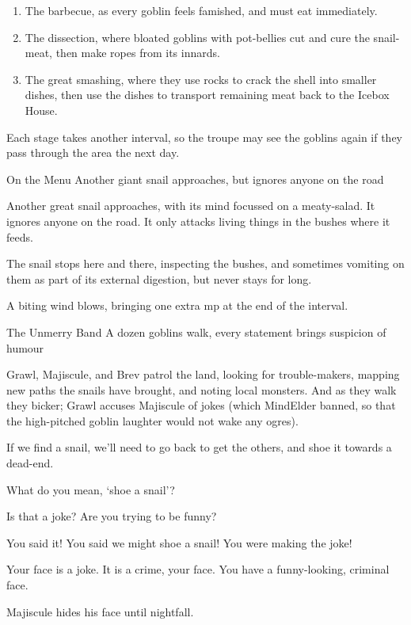 \begin{enumerate}
  \item
  The barbecue, as every goblin feels famished, and must eat immediately.
  \item
  The dissection, where bloated goblins with pot-bellies cut and cure the snail-meat, then make ropes from its innards.
  \item
  The great smashing, where they use rocks to crack the shell into smaller dishes, then use the dishes to transport remaining meat back to the Icebox House.
\end{enumerate}

Each stage takes another \gls{interval}, so the troupe may see the goblins again if they pass through the area the next day.

{On the Menu}%
{Another giant snail approaches, but ignores anyone on the road}%

Another great snail approaches, with its mind focussed on a meaty-salad.
It ignores anyone on the road.
It only attacks living things in the bushes where it feeds.

The snail stops here and there, inspecting the bushes, and sometimes vomiting on them as part of its external digestion, but never stays for long.

A biting wind blows, bringing one extra \gls{mp} at the end of the \gls{interval}.

{The Unmerry Band}%
{A dozen goblins walk, every statement brings suspicion of humour}%

Grawl, Majiscule, and Brev patrol the land, looking for trouble-makers, mapping new paths the snails have brought, and noting local monsters.
And as they walk they bicker; Grawl accuses Majiscule of jokes (which \gls{MindElder} banned, so that the high-pitched goblin laughter would not wake any \glspl{ogre}).

\begin{speechtext}

  If we find a snail, we'll need to go back to get the others, and shoe it towards a dead-end.

  What do you mean, `shoe a snail'?

  Is that a joke?
  Are you trying to be funny?

  You said it!
  You said we might shoe a snail!
  You were making the joke!

  Your face is a joke.
  It is a crime, your face.
  You have a funny-looking, criminal face.

\end{speechtext}

Majiscule hides his face until nightfall.
